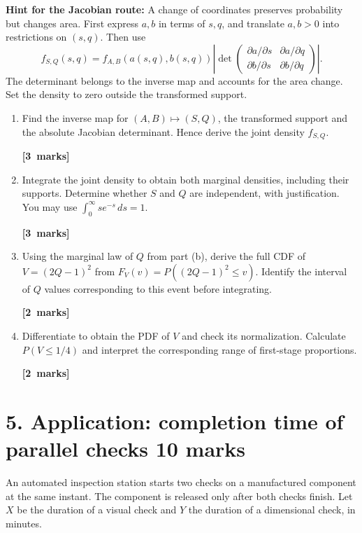 \documentclass[11pt,a4paper]{article}
\newcommand{\pts}[1]{\par\nobreak\hfill\mbox{\textbf{[#1 marks]}}}
\begin{document}
\textbf{Hint for the Jacobian route:} A change of coordinates preserves probability but changes area. First express $a,b$ in terms of $s,q$, and translate $a,b>0$ into restrictions on $(s,q)$. Then use
\[
f_{S,Q}(s,q)=f_{A,B}(a(s,q),b(s,q))\left|\det
\begin{pmatrix}\partial a/\partial s&\partial a/\partial q\\
\partial b/\partial s&\partial b/\partial q\end{pmatrix}\right|.
\]
The determinant belongs to the inverse map and accounts for the area change. Set the density to zero outside the transformed support.
\begin{enumerate}
\item Find the inverse map for $(A,B)\mapsto(S,Q)$, the transformed support and the absolute Jacobian determinant. Hence derive the joint density $f_{S,Q}$. \pts{3}
\item Integrate the joint density to obtain both marginal densities, including their supports. Determine whether $S$ and $Q$ are independent, with justification. You may use $\int_0^\infty se^{-s}\,ds=1$. \pts{3}
\item Using the marginal law of $Q$ from part (b), derive the full CDF of $V=(2Q-1)^2$ from $F_V(v)=P((2Q-1)^2\le v)$. Identify the interval of $Q$ values corresponding to this event before integrating. \pts{2}
\item Differentiate to obtain the PDF of $V$ and check its normalization. Calculate $P(V\le1/4)$ and interpret the corresponding range of first-stage proportions. \pts{2}
\end{enumerate}

\clearpage
\section*{5. Application: completion time of parallel checks \hfill 10 marks}
An automated inspection station starts two checks on a manufactured component at the same instant. The component is released only after both checks finish. Let $X$ be the duration of a visual check and $Y$ the duration of a dimensional check, in minutes.
\end{document}

